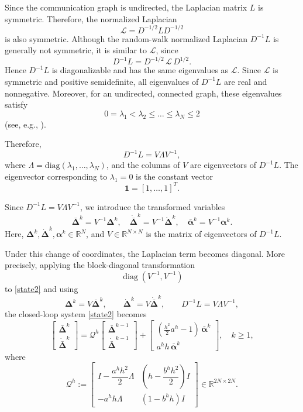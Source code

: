 \documentclass[letterpaper,journal]{IEEEtran}
\begin{document}
Since the communication graph is undirected, the Laplacian matrix \(L\) is symmetric. Therefore, the normalized Laplacian
\[
\mathcal L = D^{-1/2} L D^{-1/2}
\]
is also symmetric. Although the random-walk normalized Laplacian \(D^{-1}L\) is generally not symmetric, it is similar to \(\mathcal L\), since
\[
D^{-1}L = D^{-1/2}\,\mathcal L\,D^{1/2}.
\]
Hence \(D^{-1}L\) is diagonalizable and has the same eigenvalues as \(\mathcal L\). Since \(\mathcal L\) is symmetric and positive semidefinite, all eigenvalues of \(D^{-1}L\) are real and nonnegative. Moreover, for an undirected, connected graph, these eigenvalues satisfy
\[
0=\lambda_1 < \lambda_2\le \dots \le \lambda_N\le 2
\]
(see, e.g., \cite{Biggs}).

Therefore,
\[
D^{-1}L = V\Lambda V^{-1},
\]
where \(\Lambda=\mathrm{diag}(\lambda_1,\dots,\lambda_N)\), and the columns of \(V\) are eigenvectors of \(D^{-1}L\). The eigenvector corresponding to \(\lambda_1=0\) is the constant vector
\[
\mathbf 1=[1,\dots,1]^T.
\]

Since $D^{-1}L = V\Lambda V^{-1}$, we introduce the transformed variables
\begin{equation}\label{varsub}
\bar{\bm{\Delta}}^k = V^{-1}\bm{\Delta}^k,
\quad
\dot{\bar{\bm{\Delta}}}^k = V^{-1}\dot{\bm{\Delta}}^k,
\quad
\bar{\bm{\alpha}}^k = V^{-1}\bm{\alpha}^k .
\end{equation}
Here, $\bm{\Delta}^k,\dot{\bm{\Delta}}^k,\bm{\alpha}^k \in \mathbb{R}^N$,
and $V \in \mathbb{R}^{N\times N}$ is the matrix of eigenvectors of $D^{-1}L$.

Under this change of coordinates, the Laplacian term becomes diagonal. More precisely, applying the block-diagonal transformation
\[
\operatorname{diag}(V^{-1},V^{-1})
\]
to \eqref{state2} and using
\[
\bm{\Delta}^k = V\bar{\bm{\Delta}}^k,
\qquad
\dot{\bm{\Delta}}^k = V\dot{\bar{\bm{\Delta}}}^k,
\qquad
D^{-1}L=V\Lambda V^{-1},
\]
the closed-loop system \eqref{state2} becomes
\begin{equation}\label{state3}
\begin{bmatrix}
\bar{\bm{\Delta}}^k  \\[5pt]
\dot{\bar{\bm{\Delta}}}^k
\end{bmatrix}
=
\mathcal Q^{h}
\begin{bmatrix}
\bar{\bm{\Delta}}^{k-1}  \\[5pt]
\dot{\bar{\bm{\Delta}}}^{k-1}
\end{bmatrix}
+
\begin{bmatrix}
(\tfrac{h^2}{2}a^h-1)\,\bar{\bm{\alpha}}^{k} \\[5pt]
a^h h\,\bar{\bm{\alpha}}^{k}
\end{bmatrix},
\quad k\ge1,
\end{equation}
where
\[
\mathcal Q^{h}:=
\begin{bmatrix}
I - \dfrac{a^{h}h^{2}}{2}\Lambda 
& \left(h - \dfrac{b^{h} h^{2}}{2}\right) I \\[6pt]
- a^{h} h \Lambda  
& (1 - b^{h} h) I
\end{bmatrix}
\in \mathbb{R}^{2N\times 2N}.
\]
\end{document}
